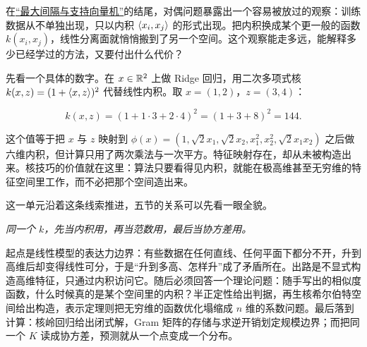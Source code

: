 在\hyperref[sec:09-Convex-Optimization/07-Applications/03]{``最大间隔与支持向量机''}的结尾，对偶问题暴露出一个容易被放过的观察：训练数据从不单独出现，只以内积 \(\left\langle x_i,x_j\right\rangle\) 的形式出现。把内积换成某个更一般的函数 \(k(x_i,x_j)\)，线性分离面就悄悄搬到了另一个空间。这个观察能走多远，能解释多少已经学过的方法，又要付出什么代价？

先看一个具体的数字。在 \(x\in\mathbb{R}^2\) 上做 Ridge 回归，用二次多项式核 \(k(x,z)=(1+\left\langle x,z\right\rangle)^2\) 代替线性内积。取 \(x=(1,2)\)，\(z=(3,4)\)：

\[
k(x,z)=(1+1\cdot3+2\cdot4)^2=(1+3+8)^2=144.
\]

这个值等于把 \(x\) 与 \(z\) 映射到 \(\phi(x)=(1,\sqrt2 x_1,\sqrt2 x_2,x_1^2,x_2^2,\sqrt2 x_1x_2)\) 之后做六维内积，但计算只用了两次乘法与一次平方。特征映射存在，却从未被构造出来。核技巧的价值就在这里：算法只要看得见内积，就能在极高维甚至无穷维的特征空间里工作，而不必把那个空间造出来。

这一单元沿着这条线索推进，五节的关系可以先看一眼全貌。

\begin{center}
\end{center}

\emph{同一个 \(k\)，先当内积用，再当范数用，最后当协方差用。}

起点是线性模型的表达力边界：有些数据在任何直线、任何平面下都分不开，升到高维后却变得线性可分，于是``升到多高、怎样升''成了矛盾所在。出路是不显式构造高维特征，只通过内积访问它。随后必须回答一个理论问题：随手写出的相似度函数，什么时候真的是某个空间里的内积？半正定性给出判据，再生核希尔伯特空间给出构造，表示定理则把无穷维的函数优化塌缩成 \(n\) 维的系数问题。最后落到计算：核岭回归给出闭式解，Gram 矩阵的存储与求逆开销划定规模边界；而把同一个 \(K\) 读成协方差，预测就从一个点变成一个分布。

